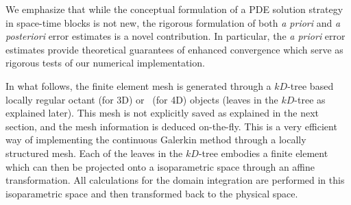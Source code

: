 We emphasize that while the conceptual formulation of a PDE solution strategy in space-time blocks is not new, the rigorous formulation of both {\it a priori} and {\it a posteriori} error estimates is a novel contribution. In particular, the {\it a priori} error estimates provide theoretical guarantees of enhanced convergence which serve as rigorous tests of our numerical implementation.

In what follows, the finite element mesh is generated through a $kD$-tree based locally regular octant (for 3D) or \stra~(for 4D) objects (leaves in the $kD$-tree as explained later). This mesh is
not explicitly saved as explained in the next section, and the mesh information is deduced on-the-fly. This is a very efficient way of implementing the continuous Galerkin method through a locally structured mesh. Each of the leaves in the $kD$-tree embodies a finite element which can then be projected onto a isoparametric space through an affine transformation. All calculations for the domain integration are performed in this isoparametric space and then transformed back to the physical space.  
